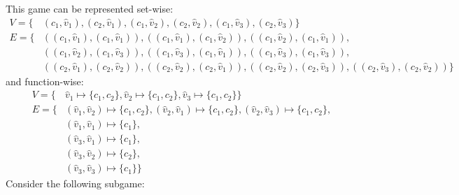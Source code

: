 \begin{example}
\begin{center}
	\end{center}
	This game can be represented set-wise:
	\begin{align*}
	V = \{&(c_1,\hat{v}_1),(c_2,\hat{v}_1),(c_1,\hat{v}_2),(c_2,\hat{v}_2),(c_1,\hat{v}_3),(c_2,\hat{v}_3) \}\\
	E = \{& ((c_1,\hat{v}_1),(c_1,\hat{v}_1)),((c_1,\hat{v}_1),(c_1,\hat{v}_2)),((c_1,\hat{v}_2),(c_1,\hat{v}_1)),\\
	&((c_1,\hat{v}_2),(c_1,\hat{v}_3)),((c_1,\hat{v}_3),(c_1,\hat{v}_1)),((c_1,\hat{v}_3),(c_1,\hat{v}_3)), \\
	&((c_2,\hat{v}_1),(c_2,\hat{v}_2)),((c_2,\hat{v}_2),(c_2,\hat{v}_1)),((c_2,\hat{v}_2),(c_2,\hat{v}_3)),((c_2,\hat{v}_3),(c_2,\hat{v}_2))\}
	\end{align*}
	and function-wise:
	\begin{align*}
	V = \{&\hat{v}_1 \mapsto \{c_1,c_2\},\hat{v}_2 \mapsto \{c_1,c_2\},\hat{v}_3 \mapsto \{c_1,c_2\}\}\\
	E = \{&(\hat{v}_1,\hat{v}_2) \mapsto \{c_1,c_2\},(\hat{v}_2,\hat{v}_1) \mapsto \{c_1,c_2\},(\hat{v}_2,\hat{v}_3) \mapsto \{c_1,c_2\},\\
	&(\hat{v}_1,\hat{v}_1) \mapsto \{c_1\},\\
	&(\hat{v}_3,\hat{v}_1) \mapsto \{c_1\},\\
	&(\hat{v}_3,\hat{v}_2) \mapsto \{c_2\},\\
	&(\hat{v}_3,\hat{v}_3) \mapsto \{c_1\}\}
	\end{align*}
	Consider the following subgame:
	\begin{center}
\end{center}
\end{example}
